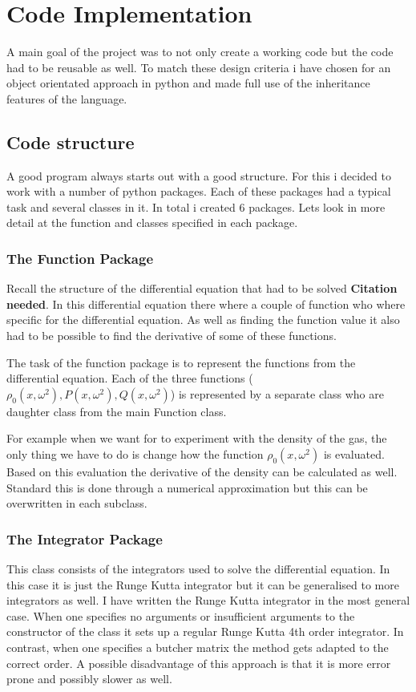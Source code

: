 \section{Code Implementation}


A main goal of the project was to not only create a working code but the code had to be reusable as well.
To match these design criteria i have chosen for an object orientated approach in python and made full use of the inheritance features of the language.


\subsection{Code structure}

A good program always starts out with a good structure. 
For this i decided to work with a number of python packages.
Each of these packages had a typical task and several classes in it.
In total i created 6 packages.
Lets look in more detail at the function and classes specified in each package.
\subsubsection{The Function Package}
Recall the structure of the differential equation that had to be solved \textbf{Citation needed}.
In this differential equation there where a couple of function who where specific for the differential equation.
As well as finding the function value it also had to be possible to find the derivative of some of these functions.
 
The task of the function package is to represent the functions from the differential equation.
Each of the three functions ($ \rho_0(x,\omega^2),P(x,\omega^2),Q(x,\omega^2) $) is represented by a separate class who are daughter class from the main Function class.

For example when we want for to experiment with the density of the gas, the only thing we have to do is change how the function $ \rho_0(x,\omega^2) $ is evaluated.
Based on this evaluation the derivative of the density can be calculated as well.
Standard this is done through a numerical approximation but this can be overwritten in each subclass.

\subsubsection{The Integrator Package}

This class consists of the integrators used to solve the differential equation.
In this case it is just the Runge Kutta integrator but it can be generalised to more integrators as well.
I have written the Runge Kutta integrator in the most general case.
When one specifies no arguments or insufficient arguments to the constructor  of the class it sets up a regular Runge Kutta 4th order integrator.
In contrast, when one specifies a butcher matrix the method gets adapted to the correct order.
A possible disadvantage of this approach is that it is more error prone and possibly slower as well.  

